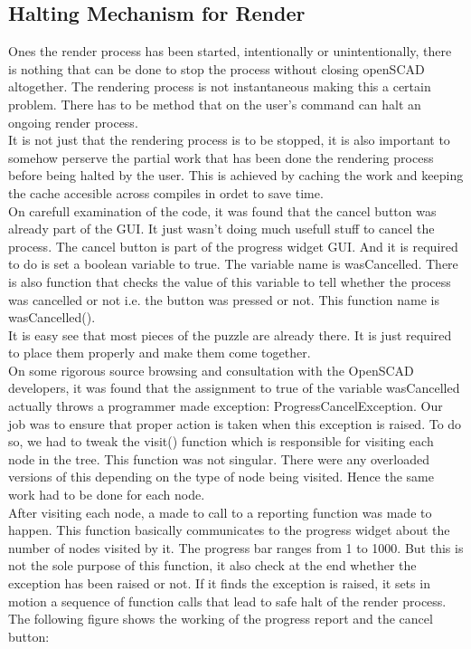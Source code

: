 \subsection{Halting Mechanism for Render}
Ones the render process has been started, intentionally or unintentionally, there is nothing that can be done to stop the process without closing openSCAD altogether. The rendering process is not instantaneous making this a certain problem. There has to be method that on the user's command can halt an ongoing render process.\\
It is not just that the rendering process is to be stopped, it is also important to somehow perserve the partial work that has been done the rendering process before being halted by the user. This is achieved by caching the work and keeping the cache accesible across compiles in ordet to save time.\\
On carefull examination of the code, it was found that the cancel button was already part of the GUI. It just wasn't doing much usefull stuff to cancel the process. The cancel button is part of the progress widget GUI. And it is required to do is set a boolean variable to true. The variable name is wasCancelled. There is also function that checks the value of this variable to tell whether the process was cancelled or not i.e. the button was pressed or not. This function name is wasCancelled().\\
It is easy see that most pieces of the puzzle are already there. It is just required to place them properly and make them come together.\\
On some rigorous source browsing and consultation with the OpenSCAD developers, it was found that the assignment to true of the variable wasCancelled actually throws a programmer made exception: ProgressCancelException. Our job was to ensure that proper action is taken when this exception is raised. To do so, we had to tweak the visit() function which is responsible for visiting each node in the tree. This function was not singular. There were any overloaded versions of this depending on the type of node being visited. Hence the same work had to be done for each node.\\
After visiting each node, a made to call to a reporting function was made to happen. This function basically communicates to the progress widget about the number of nodes visited by it. The progress bar ranges from 1 to 1000. But this is not the sole purpose of this function, it also check at the end whether the exception has been raised or not. If it finds the exception is raised, it sets in motion a sequence of function calls that lead to safe halt of the render process. The following figure shows the working of the progress report and the cancel button:
